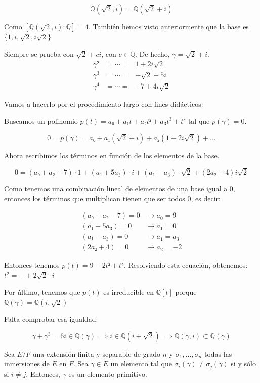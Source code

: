 \documentclass{apuntes}
\begin{document}
\begin{example}\label{EjemploTablaExtension}
\[ ℚ(\sqrt{2},i) = ℚ(\sqrt{2} + i) \]

Como $[ℚ(\sqrt{2},i):ℚ] = 4$. También hemos visto anteriormente que la base es $\{1,i,\sqrt{2},i\sqrt{2}\}$

Siempre se prueba con $\sqrt{2} + ci$, con $c∈ℚ$. De hecho, $γ = \sqrt{2} + i$.
$$\begin{array}{ccl}
γ² &= \cdots = & 1+2i\sqrt{2} \\
γ^3 &= \cdots = &  - \sqrt{2} + 5i\\
γ^4 &= \cdots = & -7 + 4i\sqrt{2}
\end{array}$$


Vamos a hacerlo por el procedimiento largo con fines didácticos:

Buscamos un polinomio $p(t) = a₀ + a₁t + a₂t² + a_3t^3 + t⁴$ tal que $p(γ) = 0$.

$$0 = p(γ) = a₀ + a₁(\sqrt{2} + i) + a₂ (1+2i\sqrt{2}) + ...$$

Ahora escribimos los términos en función de los elementos de la base.

$$0 = (a₀ + a₂ - 7) \cdot 1 + (a₁ + 5 a_3) \cdot i + (a₁ - a_3) \cdot \sqrt{2} + (2a₂ + 4)i\sqrt{2}$$

Como tenemos una combinación lineal de elementos de una base igual a $0$, entonces los términos que multiplican tienen que ser todos 0, es decir:

$$\begin{array}{cc}
(a₀ + a₂ - 7) = 0 & \to a_0 = 9\\
(a₁ + 5 a_3) = 0 & \to a_1 = 0\\
(a₁ - a_3) = 0 & \to a_1 = a_3\\
(2a₂ + 4) = 0 & \to a_2 = -2
\end{array}$$

Entonces tenemos $p(t) = 9-2t² + t⁴$. Resolviendo esta ecuación, obtenemos: $t^2 = - \pm 2\sqrt{2} \cdot i$

Por último, tenemos que $p(t)$ es irreducible en $ℚ[t]$ porque $ℚ(γ) = ℚ(i,\sqrt{2})$

Falta comprobar esa igualdad:

$$γ + γ^3 = 6i ∈ ℚ(γ) \implies i ∈ ℚ(i+\sqrt{2}) \implies ℚ(γ,i) \subset ℚ(γ) $$

\end{example}

\begin{lemma} Sea $E/F$ una extensión finita y separable de grado $n$ y $σ_1,\dotsc,σ_n$ todas las inmersiones de $E$ en $F$. Sea $γ ∈ E$ un elemento tal que $σ_i(γ) ≠ σ_j(γ)$ si y sólo si $i ≠ j$. Entonces, $γ$ es un elemento primitivo. \end{lemma}
\end{document}
